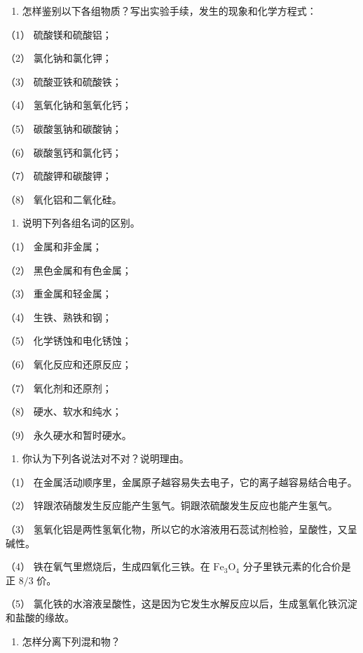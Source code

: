 \begin{enumerate}[start=2]
\item
  怎样鉴别以下各组物质？写出实验手续，发生的现象和化学方程式：
\end{enumerate}

（1） 硫酸镁和硫酸铝；

（2） 氯化钠和氯化钾；

（3） 硫酸亚铁和硫酸铁；

（4） 氢氧化钠和氢氧化钙；

（5） 碳酸氢钠和碳酸钠；

（6） 碳酸氢钙和氯化钙；

（7） 硫酸钾和碳酸钾；

（8） 氧化铝和二氧化硅。

\begin{enumerate}[start=3]
\item
  说明下列各组名词的区别。
\end{enumerate}

（1） 金属和非金属；

（2） 黑色金属和有色金属；

（3） 重金属和轻金属；

（4） 生铁、熟铁和钢；

（5） 化学锈蚀和电化锈蚀；

（6） 氧化反应和还原反应；

（7） 氧化剂和还原剂；

（8） 硬水、软水和纯水；

（9） 永久硬水和暂时硬水。

\begin{enumerate}[start=4]
\item
  你认为下列各说法对不对？说明理由。
\end{enumerate}

（1） 在金属活动顺序里，金属原子越容易失去电子，它的离子越容易结合电子。

（2） 锌跟浓硝酸发生反应能产生氢气。铜跟浓硫酸发生反应也能产生氢气。

（3）
氢氧化铝是两性氢氧化物，所以它的水溶液用石蕊试剂检验，呈酸性，又呈碱性。

（4） 铁在氧气里燃烧后，生成四氧化三铁。在
\(\mathrm{Fe}_{3} \mathrm{O}_{4}\) 分子里铁元素的化合价是正 \(8 / 3\)
价。

（5）
氯化铁的水溶液呈酸性，这是因为它发生水解反应以后，生成氢氧化铁沉淀和盐酸的缘故。

\begin{enumerate}[start=5]
\item
  怎样分离下列混和物？
\end{enumerate}

